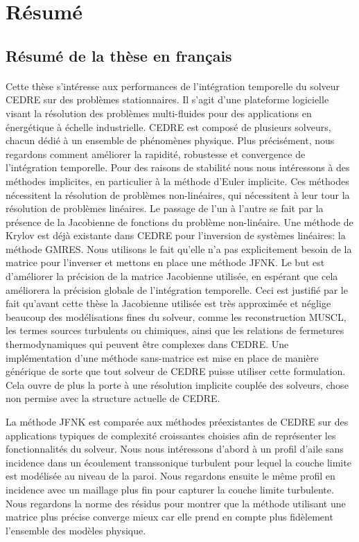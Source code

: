 \section{Résumé}

  \subsection{Résumé de la thèse en français}

    \paragraph{}
Cette thèse s'intéresse aux performances de l'intégration temporelle du solveur CEDRE sur des problèmes stationnaires.
Il s'agit d'une plateforme logicielle visant la résolution des problèmes multi-fluides pour des applications en énergétique à échelle industrielle.
CEDRE est composé de plusieurs solveurs, chacun dédié à un ensemble de phénomènes physique.
Plus précisément, nous regardons comment améliorer la rapidité, robustesse et convergence de l’intégration temporelle.
Pour des raisons de stabilité nous nous intéressons à des méthodes implicites, en particulier à la méthode d'Euler implicite.
Ces méthodes nécessitent la résolution de problèmes non-linéaires, qui nécessitent à leur tour la résolution de problèmes linéaires.
Le passage de l'un à l'autre se fait par la présence de la Jacobienne de fonctions du problème non-linéaire.
Une méthode de Krylov est déjà existante dans CEDRE pour l'inversion de systèmes linéaires: la méthode GMRES.
Nous utilisons le fait qu'elle n'a pas explicitement besoin de la matrice pour l'inverser et mettons en place une méthode JFNK.
Le but est d'améliorer la précision de la matrice Jacobienne utilisée, en espérant que cela améliorera la précision globale de l'intégration temporelle.
Ceci est justifié par le fait qu'avant cette thèse la Jacobienne utilisée est très approximée et néglige beaucoup des modélisations fines du solveur, comme les reconstruction MUSCL, les termes sources turbulents ou chimiques, ainsi que les relations de fermetures thermodynamiques qui peuvent être complexes dans CEDRE.
Une implémentation d'une méthode sans-matrice est mise en place de manière générique de sorte que tout solveur de CEDRE puisse utiliser cette formulation.
Cela ouvre de plus la porte à une résolution implicite couplée des solveurs, chose non permise avec la structure actuelle de CEDRE.

La méthode JFNK est comparée aux méthodes préexistantes de CEDRE sur des applications typiques de complexité croissantes choisies afin de représenter les fonctionnalités du solveur.
Nous nous intéressons d'abord à un profil d'aile sans incidence dans un écoulement transsonique turbulent pour lequel la couche limite est modélisée au niveau de la paroi.
Nous regardons ensuite le même profil en incidence avec un maillage plus fin pour capturer la couche limite turbulente.
Nous regardons la norme des résidus pour montrer que la méthode utilisant une matrice plus précise converge mieux car elle prend en compte plus fidèlement l'ensemble des modèles physique.

